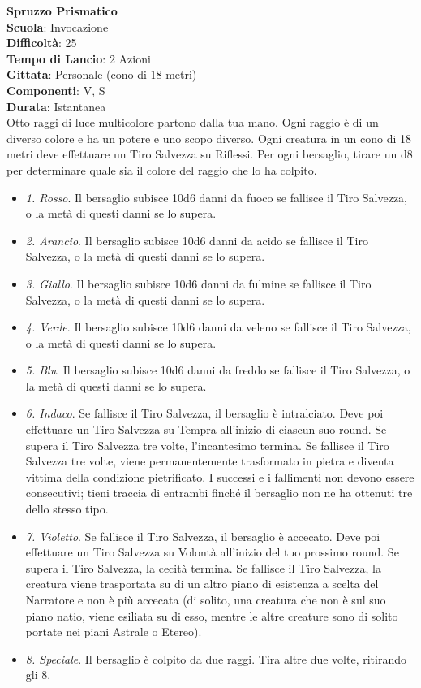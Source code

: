 \begin{multicols}{2}
\medskip\textbf{Spruzzo Prismatico}\\
\textbf{Scuola}: Invocazione\\
\textbf{Difficoltà}: 25\\
\textbf{Tempo di Lancio}: 2 Azioni\\
\textbf{Gittata}: Personale (cono di 18 metri)\\
\textbf{Componenti}: V, S\\
\textbf{Durata}: Istantanea\\
Otto raggi di luce multicolore partono dalla tua mano. Ogni raggio è di un diverso colore e ha un potere e uno scopo diverso. Ogni creatura in un cono di 18 metri deve effettuare un Tiro Salvezza su Riflessi. Per ogni bersaglio, tirare un d8 per determinare quale sia il colore del raggio che lo ha colpito.\\
\medskip
\begin{itemize}
\item
\textit{1. Rosso}. Il bersaglio subisce 10d6 danni da fuoco se fallisce il Tiro Salvezza, o la metà di questi danni se lo supera.
\item
\textit{2. Arancio}. Il bersaglio subisce 10d6 danni da acido se fallisce il Tiro Salvezza, o la metà di questi danni se lo supera.
\item
\textit{3. Giallo}. Il bersaglio subisce 10d6 danni da fulmine se fallisce il Tiro Salvezza, o la metà di questi danni se lo supera.
\item
\textit{4. Verde}. Il bersaglio subisce 10d6 danni da veleno se fallisce il Tiro Salvezza, o la metà di questi danni se lo supera.
\item
\textit{5. Blu}. Il bersaglio subisce 10d6 danni da freddo se fallisce il Tiro Salvezza, o la metà di questi danni se lo supera.
\item
\textit{6. Indaco}. Se fallisce il Tiro Salvezza, il bersaglio è intralciato. Deve poi effettuare un Tiro Salvezza su Tempra all'inizio di ciascun suo round. Se supera il Tiro Salvezza tre volte, l'incantesimo termina. Se fallisce il Tiro Salvezza tre volte, viene permanentemente trasformato in pietra e diventa vittima della condizione pietrificato. I successi e i fallimenti non devono essere consecutivi; tieni traccia di entrambi finché il bersaglio non ne ha ottenuti tre dello stesso tipo.
\item
\textit{7. Violetto}. Se fallisce il Tiro Salvezza, il bersaglio è accecato. Deve poi effettuare un Tiro Salvezza su Volontà all'inizio del tuo prossimo round. Se supera il Tiro Salvezza, la cecità termina. Se fallisce il Tiro Salvezza, la creatura viene trasportata su di un altro piano di esistenza a scelta del Narratore e non è più accecata (di solito, una creatura che non è sul suo piano natio, viene esiliata su di esso, mentre le altre creature sono di solito portate nei piani Astrale o Etereo).
\item
\textit{8. Speciale}. Il bersaglio è colpito da due raggi. Tira altre due volte, ritirando gli 8.
\end{itemize}


\end{multicols}
